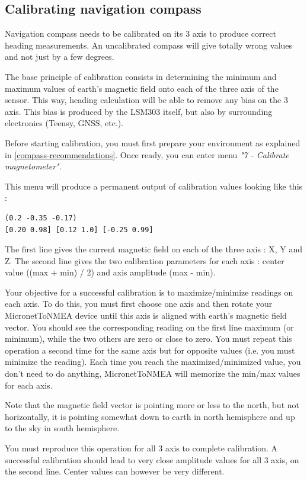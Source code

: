 \documentclass{report}
\begin{document}
\subsection{Calibrating navigation compass}

Navigation compass needs to be calibrated on its 3 axis to produce correct heading measurements. An uncalibrated compass will give totally wrong values and not just by a few degrees.

The base principle of calibration consists in determining the minimum and maximum values of earth's magnetic field onto each of the three axis of the sensor. This way, heading calculation will be able to remove any bias on the 3 axis. This bias is produced by the LSM303 itself, but also by surrounding electronics (Teensy, GNSS, etc.).

Before starting calibration, you must first prepare your environment as explained in \ref{compass-recommendations}. Once ready, you can enter menu \emph{"7 - Calibrate magnetometer"}.

This menu will produce a permanent output of calibration values looking like this :

\begin{verbatim}
(0.2 -0.35 -0.17)
[0.20 0.98] [0.12 1.0] [-0.25 0.99]
\end{verbatim}

The first line gives the current magnetic field on each of the three axis : X, Y and Z.
The second line gives the two calibration parameters for each axis : center value ((max + min) / 2) and axis amplitude (max - min).

Your objective for a successful calibration is to maximize/minimize readings on each axis. To do this, you must first choose one axis and then rotate your MicronetToNMEA device until this axis is aligned with earth's magnetic field vector. You should see the corresponding reading on the first line maximum (or minimum), while the two others are zero or close to zero.
You must repeat this operation a second time for the same axis but for opposite values (i.e. you must minimize the reading). Each time you reach the maximized/minimized value, you don't need to do anything, MicronetToNMEA will memorize the min/max values for each axis.

Note that the magnetic field vector is pointing more or less to the north, but not horizontally, it is pointing somewhat down to earth in north hemisphere and up to the sky in south hemisphere.

You must reproduce this operation for all 3 axis to complete calibration.
A successful calibration should lead to very close amplitude values for all 3 axis, on the second line. Center values can however be very different.
\end{document}
